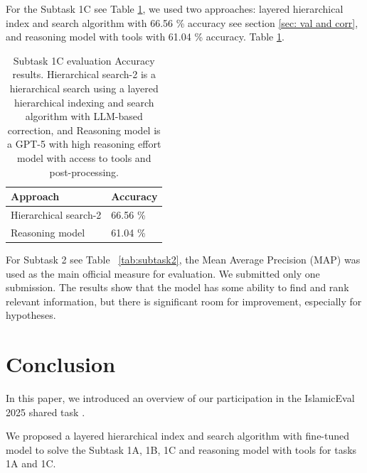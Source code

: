 \documentclass[11pt]{article}
\begin{document}
For the Subtask 1C see Table \ref{tab:1C}, we used two approaches: layered hierarchical index and search algorithm with 66.56 \% accuracy see section \ref{sec: val and corr}, and reasoning model with tools with 61.04 \% accuracy.
Table \ref{tab:1C}.
\begin{table}[H]
  \begin{tabular}{ll}
    \hline
    \textbf{Approach}           & \textbf{Accuracy}  \\
    \hline
    Hierarchical search-2    &         66.56 \%                 \\
    Reasoning model                &              61.04 \%            \\
    \hline
  \end{tabular}
  \caption{\label{tab:1C}
    Subtask 1C evaluation Accuracy results. Hierarchical search-2 is a hierarchical search using a layered hierarchical indexing and search algorithm with LLM-based correction, and  Reasoning model is a GPT-5 with high reasoning effort model with access to tools and post-processing. 
  }
\end{table}

For Subtask 2 see Table ~\ref{tab:subtask2}, the Mean Average Precision (MAP) was used as the main official measure for evaluation. We submitted only one submission. The results show that the model has some ability to find and rank relevant information, but there is significant room for improvement, especially for hypotheses.
\begin{table}[H]
  \caption{\label{tab:subtask2}
    Subtask 2 results. 
  }
\end{table}


\section{Conclusion}
In this paper, we introduced an overview of our participation in the IslamicEval 2025 shared task \citet {mubarak2025islamiceval}.

We proposed a layered hierarchical index and search algorithm with fine-tuned model to solve the Subtask 1A, 1B, 1C and reasoning model with tools for tasks 1A and 1C. 
\end{document}
